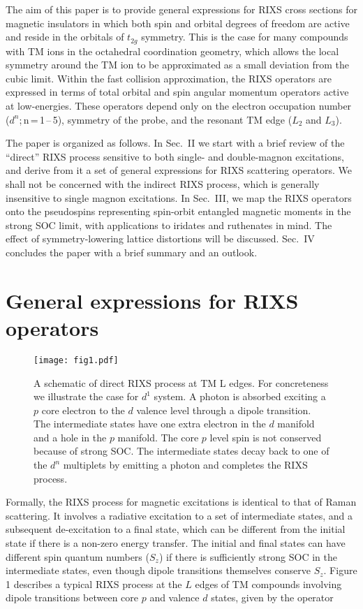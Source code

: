 \documentclass[twocolumn,prb,aps,showpacs,superscriptaddress]{revtex4-1}
\begin{document}
The aim of this paper is to provide general expressions for RIXS cross
sections for magnetic insulators in which both spin and orbital degrees of
freedom are active and reside in the orbitals of $t_{2g}$ symmetry. This is
the case for many compounds with TM ions in the octahedral coordination
geometry, which allows the local symmetry around the TM ion to be approximated
as a small deviation from the cubic limit. Within the fast collision 
approximation\cite{VeePRL06}, the RIXS operators are expressed in terms of 
total orbital and spin angular momentum operators active at low-energies. 
These operators depend only on the electron occupation number 
($d^n$;\,n\,=\,1\,--\,5), symmetry of the probe, and the resonant 
TM edge ($L_2$ and $L_3$).   

The paper is organized as follows. In Sec.~II we start with a brief review of
the ``direct'' RIXS process sensitive to both single- and double-magnon
excitations, and derive from it a set of general expressions for RIXS
scattering operators. We shall not be concerned with the indirect RIXS
process, which is generally insensitive to single magnon 
excitations\cite{AmentReview}. In Sec.~III, we map the RIXS operators onto the
pseudospins representing spin-orbit entangled magnetic moments in the strong 
SOC limit, with applications to iridates and ruthenates in mind. The effect 
of symmetry-lowering lattice distortions will be discussed. Sec.~IV concludes 
the paper with a brief summary and an outlook. 

\section{General expressions for RIXS operators}

\begin{figure}
\centerline{\texttt{[image: fig1.pdf]}}
\caption{A schematic of direct RIXS process at TM L edges. For concreteness we
  illustrate the case for $d^1$ system. A photon is absorbed exciting a $p$
  core electron to the $d$ valence level through a dipole transition. The
  intermediate states have one extra electron in the $d$ manifold and a hole
  in the $p$ manifold. The core $p$ level spin is not conserved because of
  strong SOC. The intermediate states decay back to one of the $d^{n}$ 
  multiplets by emitting a photon and completes the RIXS process.} 
\end{figure}

Formally, the RIXS process for magnetic excitations is identical to that of
Raman scattering. It involves a radiative excitation to a set of intermediate
states, and a subsequent de-excitation to a final state, which can be
different from the initial state if there is a non-zero energy transfer. The
initial and final states can have different spin quantum numbers ($S_z$) if
there is sufficiently strong SOC in the intermediate states, even though
dipole transitions themselves conserve $S_z$. Figure 1 describes a typical
RIXS process at the $L$ edges of TM compounds involving dipole transitions
between core $p$ and valence $d$ states, given by the operator  
\end{document}
